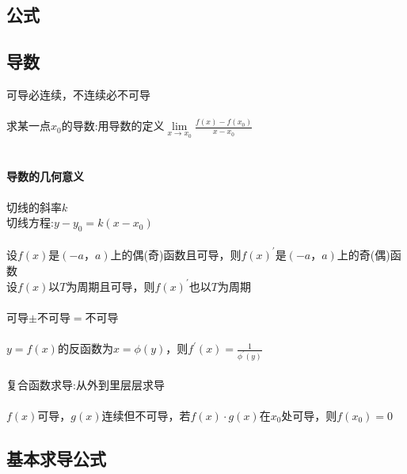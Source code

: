 \documentclass{article}
\begin{document}
\begin{flushleft}
	\LARGE
	
	\section{公式}
	
	\subsection{导数}
	
	可导必连续，不连续必不可导\\
	~\\
	求某一点$x_0$的导数:用导数的定义$\lim\limits_{x\to x_0} \frac{f(x)-f(x_0
		)}{x-x_0}$\\
	~\\
	\paragraph{导数的几何意义}
	切线的斜率$k$\\
	切线方程:$y-y_0=k(x-x_0)$\\
	~\\
	设$f(x)$是$(-a，a)$上的偶(奇)函数且可导，则$f(x)^{'}$是$(-a，a)$上的奇(偶)函数\\
	设$f(x)$以$T$为周期且可导，则$f(x)^{'}$也以$T$为周期\\
	~\\
	可导$\pm$不可导$=$不可导\\
	~\\
	$y=f(x)$的反函数为$x=\phi(y)$，则$f^{'}(x)=\frac{1}{\phi^{'}(y)}$\\
	~\\
	复合函数求导:从外到里层层求导\\
	~\\
	$f(x)$可导，$g(x)$连续但不可导，若$f(x)\cdot g(x)$在$x_0$处可导，则$f(x_0)=0$\\
	
	\subsection{基本求导公式}
	

\end{flushleft}
\end{document}
